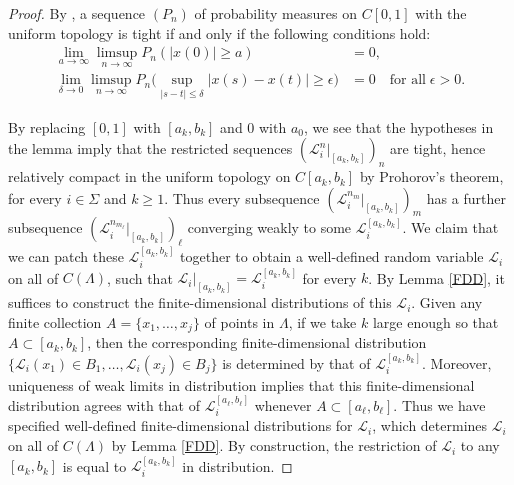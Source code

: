 \begin{proof}
	
By \cite[Theorem 7.3]{Billing}, a sequence $(P_n)$ of probability measures on $C[0,1]$ with the uniform topology is tight if and only if the following conditions hold:
\begin{align*}
\lim_{a\to\infty} \limsup_{n\to\infty} P_n(|x(0)|\geq a) &= 0, \\
\lim_{\delta\to 0} \limsup_{n\to\infty} P_n\Big(\sup_{|s-t|\leq\delta} |x(s)-x(t)| \geq \epsilon\Big) &= 0 \quad \textrm{for all}\;\epsilon>0.
\end{align*}

By replacing $[0,1]$ with $[a_k,b_k]$ and 0 with $a_0$, we see that the hypotheses in the lemma imply that the restricted sequences $(\mathcal{L}^n_i|_{[a_k,b_k]})_n$ are tight, hence relatively compact in the uniform topology on $C[a_k,b_k]$ by Prohorov's theorem, for every $i\in\Sigma$ and $k\geq 1$. Thus every subsequence $(\mathcal{L}^{n_m}_i|_{[a_k,b_k]})_m$ has a further subsequence $(\mathcal{L}^{n_{m_\ell}}_i|_{[a_k,b_k]})_\ell$ converging weakly to some $\mathcal{L}_i^{[a_k,b_k]}$. We claim that we can patch these $\mathcal{L}_i^{[a_k,b_k]}$ together to obtain a well-defined random variable $\mathcal{L}_i$ on all of $C(\Lambda)$, such that $\mathcal{L}_i|_{[a_k,b_k]} = \mathcal{L}_i^{[a_k,b_k]}$ for every $k$. By Lemma \ref{FDD}, it suffices to construct the finite-dimensional distributions of this $\mathcal{L}_i$. Given any finite collection $A=\{x_1,\dots,x_j\}$ of points in $\Lambda$, if we take $k$ large enough so that $A \subset [a_k,b_k]$, then the corresponding finite-dimensional distribution $\{\mathcal{L}_i(x_1)\in B_1, \dots, \mathcal{L}_i(x_j) \in B_j\}$ is determined by that of $\mathcal{L}_i^{[a_k,b_k]}$. Moreover, uniqueness of weak limits in distribution implies that this finite-dimensional distribution agrees with that of $\mathcal{L}_i^{[a_\ell,b_\ell]}$ whenever $A\subset[a_\ell,b_\ell]$. Thus we have specified well-defined finite-dimensional distributions for $\mathcal{L}_i$, which determines $\mathcal{L}_i$ on all of $C(\Lambda)$ by Lemma \ref{FDD}. By construction, the restriction of $\mathcal{L}_i$ to any $[a_k,b_k]$ is equal to $\mathcal{L}_i^{[a_k,b_k]}$ in distribution.


\end{proof}
